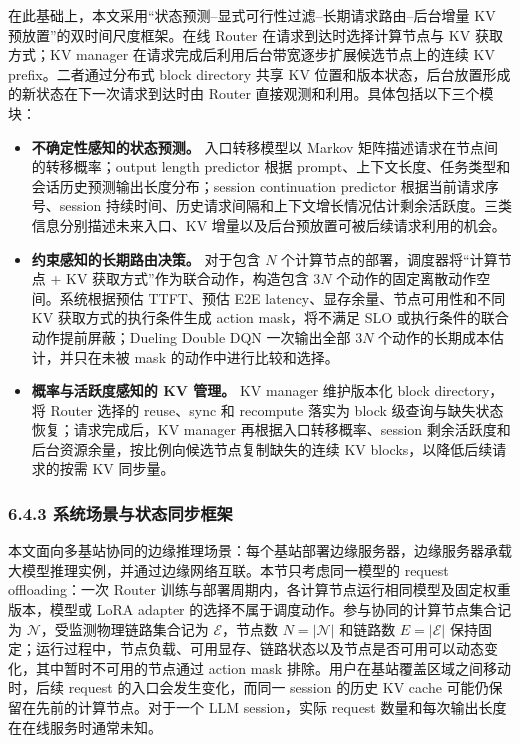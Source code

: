 在此基础上，本文采用“状态预测--显式可行性过滤--长期请求路由--后台增量 KV 预放置”的双时间尺度框架。在线 Router 在请求到达时选择计算节点与 KV 获取方式；KV manager 在请求完成后利用后台带宽逐步扩展候选节点上的连续 KV prefix。二者通过分布式 block directory 共享 KV 位置和版本状态，后台放置形成的新状态在下一次请求到达时由 Router 直接观测和利用。具体包括以下三个模块：
\begin{itemize}
    \item \textbf{不确定性感知的状态预测。} 入口转移模型以 Markov 矩阵描述请求在节点间的转移概率；output length predictor 根据 prompt、上下文长度、任务类型和会话历史预测输出长度分布；session continuation predictor 根据当前请求序号、session 持续时间、历史请求间隔和上下文增长情况估计剩余活跃度。三类信息分别描述未来入口、KV 增量以及后台预放置可被后续请求利用的机会。
    \item \textbf{约束感知的长期路由决策。} 对于包含 \(N\) 个计算节点的部署，调度器将“计算节点 + KV 获取方式”作为联合动作，构造包含 \(3N\) 个动作的固定离散动作空间。系统根据预估 TTFT、预估 E2E latency、显存余量、节点可用性和不同 KV 获取方式的执行条件生成 action mask，将不满足 SLO 或执行条件的联合动作提前屏蔽；Dueling Double DQN 一次输出全部 \(3N\) 个动作的长期成本估计，并只在未被 mask 的动作中进行比较和选择。
    \item \textbf{概率与活跃度感知的 KV 管理。} KV manager 维护版本化 block directory，将 Router 选择的 reuse、sync 和 recompute 落实为 block 级查询与缺失状态恢复；请求完成后，KV manager 再根据入口转移概率、session 剩余活跃度和后台资源余量，按比例向候选节点复制缺失的连续 KV blocks，以降低后续请求的按需 KV 同步量。
\end{itemize}

\subsubsection*{6.4.3 系统场景与状态同步框架}

本文面向多基站协同的边缘推理场景：每个基站部署边缘服务器，边缘服务器承载大模型推理实例，并通过边缘网络互联。本节只考虑同一模型的 request offloading：一次 Router 训练与部署周期内，各计算节点运行相同模型及固定权重版本，模型或 LoRA adapter 的选择不属于调度动作。参与协同的计算节点集合记为 \(\mathcal N\)，受监测物理链路集合记为 \(\mathcal E\)，节点数 \(N=|\mathcal N|\) 和链路数 \(E=|\mathcal E|\) 保持固定；运行过程中，节点负载、可用显存、链路状态以及节点是否可用可以动态变化，其中暂时不可用的节点通过 action mask 排除。用户在基站覆盖区域之间移动时，后续 request 的入口会发生变化，而同一 session 的历史 KV cache 可能仍保留在先前的计算节点。对于一个 LLM session，实际 request 数量和每次输出长度在在线服务时通常未知。

